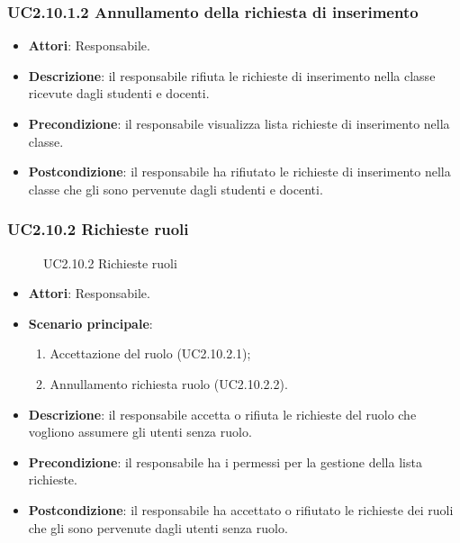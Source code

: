 \subsubsection{UC2.10.1.2 Annullamento della richiesta di inserimento}
\begin{itemize}
\item \textbf{Attori}: Responsabile.
\item \textbf{Descrizione}: il responsabile rifiuta le richieste di inserimento nella classe ricevute dagli studenti e docenti.
\item \textbf{Precondizione}: il responsabile visualizza lista richieste di inserimento nella classe.
\item \textbf{Postcondizione}: il responsabile ha rifiutato le richieste di inserimento nella classe che gli sono pervenute dagli studenti e docenti.
\end{itemize}
\subsubsection{UC2.10.2 Richieste ruoli}
\begin{figure}[H]
\centering
\noindent{}
\caption{UC2.10.2 Richieste ruoli}
\end{figure}
\begin{itemize}
\item \textbf{Attori}: Responsabile.
\item \textbf{Scenario principale}:
\begin{enumerate}
\item Accettazione del ruolo (UC2.10.2.1);
\item Annullamento richiesta ruolo (UC2.10.2.2).
\end{enumerate}
\item \textbf{Descrizione}: il responsabile accetta o rifiuta le richieste  del ruolo che vogliono assumere gli utenti senza ruolo.
\item \textbf{Precondizione}: il responsabile ha i permessi per la gestione della lista richieste.
\item \textbf{Postcondizione}: il responsabile ha accettato o rifiutato le richieste dei ruoli che gli sono pervenute dagli utenti senza ruolo.
\end{itemize}
